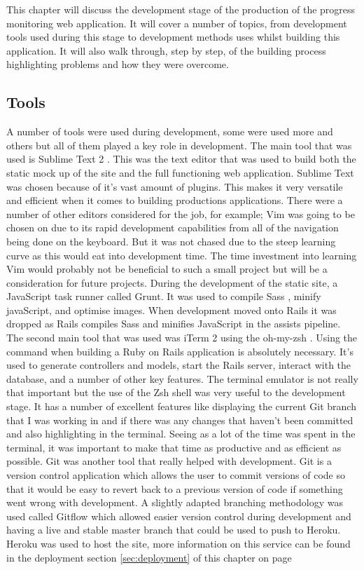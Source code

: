 This chapter will discuss the development stage of the production of the progress monitoring web application. It will cover a number of topics, from development tools used during this stage to development methods uses whilst building this application. It will also walk through, step by step, of the building process highlighting problems and how they were overcome.\\

\subsection{Tools}
A number of tools were used during development, some were used more and others but all of them played a key role in development. The main tool that was used is Sublime Text 2 \citep{sublimetext:2011}. This was the text editor that was used to build both the static mock up of the site and the full functioning web application. Sublime Text was chosen because of it's vast amount of plugins. This makes it very versatile and efficient when it comes to building productions applications. There were a number of other editors considered for the job, for example; Vim \citep{vim:2013} was going to be chosen on due to its rapid development capabilities from all of the navigation being done on the keyboard. But it was not chased due to the steep learning curve as this would eat into development time. The time investment into learning Vim would probably not be beneficial to such a small project but will be a consideration for future projects. During the development of the static site, a JavaScript task runner called Grunt. It was used to compile Sass \citep{sass:2006}, minify javaScript, and optimise images. When development moved onto Rails it was dropped as Rails compiles Sass and minifies JavaScript in the assists pipeline. The second main tool that was used was iTerm 2 \citep{iterm:2011} using the oh-my-zsh \citep{zsh:2009}. Using the command when building a Ruby on Rails application is absolutely necessary. It's used to generate controllers and models, start the Rails server, interact with the database, and a number of other key features. The terminal emulator is not really that important but the use of the Zsh shell was very useful to the development stage. It has a number of excellent features like displaying the current Git \citep{git:2014} branch that I was working in and if there was any changes that haven't been committed and also highlighting in the terminal. Seeing as a lot of the time was spent in the terminal, it was important to make that time as productive and as efficient as possible. Git was another tool that really helped with development. Git is a version control application which allows the user to commit versions of code so that it would be easy to revert back to a previous version of code if something went wrong with development. A slightly adapted branching methodology was used called Gitflow \citep{gitflow:2010} which allowed easier version control during development and having a live and stable master branch that could be used to push to Heroku. Heroku \citep{heroku:2007} was used to host the site, more information on this service can be found in the deployment section \ref{sec:deployment} of this chapter on page 